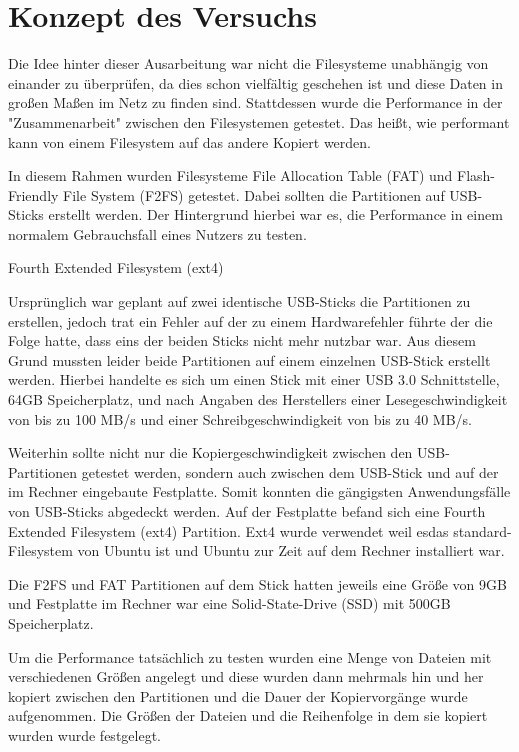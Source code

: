 \documentclass[11pt,parskip=full]{scrartcl}
\begin{document}
\section{Konzept des Versuchs}
	Die Idee hinter dieser Ausarbeitung war nicht die Filesysteme unabhängig von einander zu überprüfen, da dies schon vielfältig geschehen ist und diese Daten in großen Maßen im Netz zu finden sind. Stattdessen wurde die Performance in der "Zusammenarbeit" zwischen den Filesystemen getestet. Das heißt, wie performant kann von einem Filesystem auf das andere Kopiert werden. 
	
	In diesem Rahmen wurden Filesysteme File Allocation Table (FAT) und Flash-Friendly File System (F2FS)  getestet. Dabei sollten die Partitionen auf USB-Sticks erstellt werden. Der Hintergrund hierbei war es, die Performance in einem normalem Gebrauchsfall eines Nutzers zu testen.
	
	Fourth Extended Filesystem (ext4)
	
	Ursprünglich war geplant auf zwei identische USB-Sticks die Partitionen zu erstellen, jedoch trat ein Fehler auf der zu einem Hardwarefehler führte der die Folge hatte, dass eins der beiden Sticks nicht mehr nutzbar war. Aus diesem Grund mussten leider beide Partitionen auf einem einzelnen USB-Stick erstellt werden. Hierbei handelte es sich um einen Stick mit einer USB 3.0 Schnittstelle, 64GB Speicherplatz, und nach Angaben des Herstellers einer Lesegeschwindigkeit von bis zu 100 MB/s und einer Schreibgeschwindigkeit von bis zu 40 MB/s. 
	
	Weiterhin sollte nicht nur die Kopiergeschwindigkeit zwischen den USB-Partitionen getestet werden, sondern auch zwischen dem USB-Stick und auf der im Rechner eingebaute Festplatte. Somit konnten die gängigsten Anwendungsfälle von USB-Sticks abgedeckt werden. Auf der Festplatte befand sich eine Fourth Extended Filesystem (ext4) Partition. Ext4 wurde verwendet weil esdas standard-Filesystem von Ubuntu ist und Ubuntu zur Zeit auf dem Rechner installiert war.
	
	Die F2FS und FAT Partitionen auf dem Stick hatten jeweils eine Größe von 9GB und Festplatte im Rechner war eine Solid-State-Drive (SSD) mit 500GB Speicherplatz.
	
	Um die Performance tatsächlich zu testen wurden eine Menge von Dateien mit verschiedenen Größen angelegt und diese wurden dann mehrmals hin und her kopiert zwischen den Partitionen und die Dauer der Kopiervorgänge wurde aufgenommen. Die Größen der Dateien und die Reihenfolge in dem sie kopiert wurden wurde festgelegt. 
	
\end{document}
